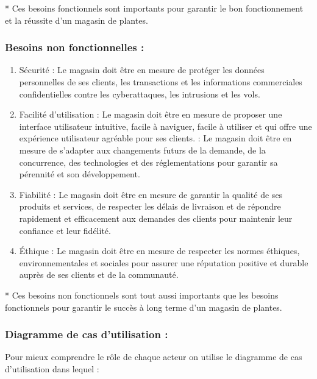 \documentclass[a4paper,12pt,oneside]{article}
\begin{document}
\vskip2mm


* Ces besoins fonctionnels sont importants pour
garantir le bon fonctionnement et la réussite d'un
magasin de plantes.

\subsubsection{Besoins non fonctionnelles :}
\begin{enumerate}
  \item Sécurité : Le magasin doit être en mesure de
protéger les données personnelles de ses
clients, les transactions et les informations
commerciales confidentielles contre les
cyberattaques, les intrusions et les vols.
  \item Facilité d'utilisation : Le magasin doit être en
mesure de proposer une interface utilisateur
intuitive, facile à naviguer, facile à utiliser et
qui offre une expérience utilisateur agréable
pour ses clients.
   : Le magasin doit être en mesure
de s'adapter aux changements futurs de la
demande, de la concurrence, des
technologies et des réglementations pour
garantir sa pérennité et son développement.
\item Fiabilité : Le magasin doit être en mesure de
garantir la qualité de ses produits et services,
de respecter les délais de livraison et de
répondre rapidement et efficacement aux
demandes des clients pour maintenir leur
confiance et leur fidélité.
\item Éthique : Le magasin doit être en mesure de
respecter les normes éthiques,
environnementales et sociales pour assurer
une réputation positive et durable auprès de
ses clients et de la communauté.
\end{enumerate}

\vskip2mm
* Ces besoins non fonctionnels sont tout aussi
importants que les besoins fonctionnels pour
garantir le succès à long terme d'un magasin de
plantes.


\subsubsection{Diagramme de cas d’utilisation :}
Pour mieux comprendre le rôle de chaque acteur on utilise le
diagramme de cas d’utilisation dans lequel :
\end{document}
